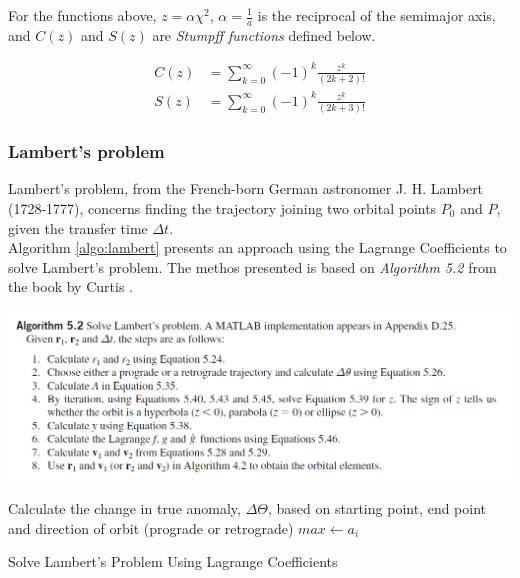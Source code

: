 For the functions above, $z = \alpha \chi^2$, $\alpha = \frac{1}{a}$ is the reciprocal of the semimajor axis, and $C(z)$ and $S(z)$ are \textit{Stumpff functions} defined below.

\begin{align}
    C(z) &= \sum_{k = 0}^{\infty} (-1)^k \frac{z^k}{(2k + 2)!} \\
    S(z) &= \sum_{k = 0}^{\infty} (-1)^k \frac{z^k}{(2k + 3)!}
\end{align}{}




\subsubsection{Lambert's problem}

Lambert's problem, from the French-born German astronomer J. H. Lambert (1728-1777), concerns finding the trajectory joining two orbital points $P_0$ and $P$, given the transfer time $\Delta t$.  \\

Algorithm \ref{algo:lambert} presents an approach using the Lagrange Coefficients to solve Lambert's problem. The methos presented is based on \textit{Algorithm 5.2} from the book by Curtis \cite{Curtis2009}.

\includegraphics[width=\textwidth]{Images/Alg52.PNG}

\begin{algorithm}
    \DontPrintSemicolon
    Calculate the change in true anomaly, $\mathit{\Delta\Theta}$, based on starting point, end point and direction of orbit (prograde or retrograde)\;
    \;
     {
       {
        $max \gets a_i$\;
      }
    }
    \;
    \caption{Solve Lambert's Problem Using Lagrange Coefficients}
    \label{algo:lambert}
\end{algorithm}

